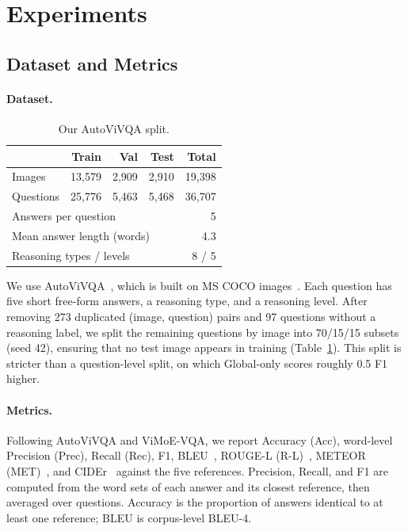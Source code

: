 \section{Experiments}
\label{sec:exp}

\subsection{Dataset and Metrics}
\label{sec:data}

\paragraph{Dataset.}
\begin{table}
\vspace{-22pt}
\centering
\caption{Our AutoViVQA split.}
\label{tab:data}
\footnotesize
\setlength{\tabcolsep}{2pt}
\begin{tabular}{lrrrr}
\toprule
 & Train & Val & Test & Total \\
\midrule
Images & 13{,}579 & 2{,}909 & 2{,}910 & 19{,}398 \\
Questions & 25{,}776 & 5{,}463 & 5{,}468 & 36{,}707 \\
\midrule
\multicolumn{4}{l}{Answers per question} & 5 \\
\multicolumn{4}{l}{Mean answer length (words)} & 4.3 \\
\multicolumn{4}{l}{Reasoning types / levels} & 8 / 5 \\
\bottomrule
\end{tabular}
\end{table}
We use AutoViVQA~\cite{autovivqa2026}, which is built on MS COCO images~\cite{lin2015coco}. Each
question has five short free-form answers, a reasoning type, and a reasoning level. After removing
273 duplicated (image, question) pairs and 97 questions without a reasoning label, we split the
remaining questions by image into 70/15/15 subsets (seed 42), ensuring that no test image appears
in training (Table~\ref{tab:data}). This split is stricter than a question-level split, on which
Global-only scores roughly 0.5 F1 higher.

\paragraph{Metrics.}
Following AutoViVQA and ViMoE-VQA, we report Accuracy (Acc), word-level Precision (Prec), Recall
(Rec), F1, BLEU~\cite{papineni2002bleu}, ROUGE-L (R-L)~\cite{lin2004rouge},
METEOR (MET)~\cite{banerjee2005meteor}, and CIDEr~\cite{vedantam2015cider} against the five
references. Precision, Recall, and F1 are computed from the word sets of each answer and its
closest reference, then averaged over questions. Accuracy is the proportion of answers identical to
at least one reference; BLEU is corpus-level BLEU-4.

